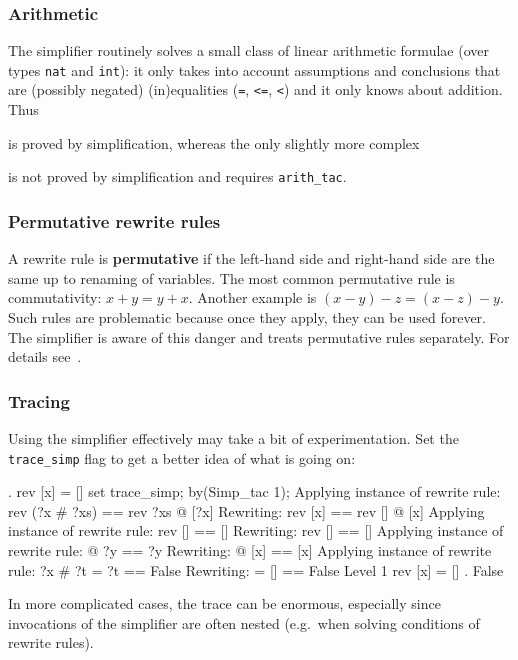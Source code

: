 \subsubsection{Arithmetic}

The simplifier routinely solves a small class of linear arithmetic formulae
(over types \texttt{nat} and \texttt{int}): it only takes into account
assumptions and conclusions that are (possibly negated) (in)equalities
(\texttt{=}, \texttt{<=}, \texttt{<}) and it only knows about addition. Thus
\begin{ttbox}
\end{ttbox}
is proved by simplification, whereas the only slightly more complex
\begin{ttbox}
\end{ttbox}
is not proved by simplification and requires \texttt{arith_tac}.

\subsubsection{Permutative rewrite rules}

A rewrite rule is {\bf permutative} if the left-hand side and right-hand side
are the same up to renaming of variables.  The most common permutative rule
is commutativity: $x+y = y+x$.  Another example is $(x-y)-z = (x-z)-y$.  Such
rules are problematic because once they apply, they can be used forever.
The simplifier is aware of this danger and treats permutative rules
separately. For details see~\cite{isabelle-ref}.

\subsubsection{Tracing}

Using the simplifier effectively may take a bit of experimentation.  Set the
\verb$trace_simp$ flag to get a better idea of what is going on:
\begin{ttbox}\makeatother
{. rev [x] = []}
\ttbreak
set trace_simp;
by(Simp_tac 1);
\ttbreak\makeatother
{\out Applying instance of rewrite rule:}
{\out rev (?x # ?xs) == rev ?xs @ [?x]}
{\out Rewriting:}
{\out rev [x] == rev [] @ [x]}
\ttbreak
{\out Applying instance of rewrite rule:}
{\out rev [] == []}
{\out Rewriting:}
{\out rev [] == []}
\ttbreak\makeatother
{\out Applying instance of rewrite rule:}
{\out [] @ ?y == ?y}
{\out Rewriting:}
{\out [] @ [x] == [x]}
\ttbreak
{\out Applying instance of rewrite rule:}
{\out ?x # ?t = ?t == False}
{\out Rewriting:}
{\out [x] = [] == False}
\ttbreak
{\out Level 1}
{\out rev [x] = []}
{. False}
\end{ttbox}
In more complicated cases, the trace can be enormous, especially since
invocations of the simplifier are often nested (e.g.\ when solving conditions
of rewrite rules).

